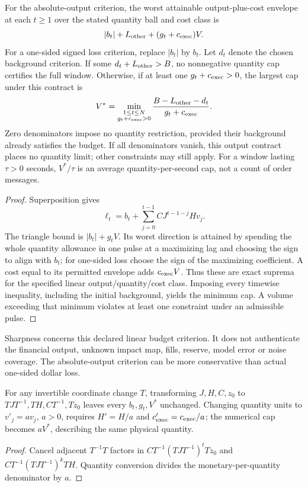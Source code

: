 \begin{proposition}
For the absolute-output criterion, the worst attainable output-plus-cost envelope at each $t\ge1$ over the stated quantity ball and cost class is
\[
|b_t|+L_{\rm other}+(g_t+c_{\rm exec})V.
\]
For a one-sided signed loss criterion, replace $|b_t|$ by $b_t$. Let $d_t$ denote the chosen background criterion. If some $d_t+L_{\rm other}>B$, no nonnegative quantity cap certifies the full window. Otherwise, if at least one $g_t+c_{\rm exec}>0$, the largest cap under this contract is
\[
V^*=\min_{\substack{1\le t\le N\\g_t+c_{\rm exec}>0}}
\frac{B-L_{\rm other}-d_t}{g_t+c_{\rm exec}}.
\]
Zero denominators impose no quantity restriction, provided their background already satisfies the budget. If all denominators vanish, this output contract places no quantity limit; other constraints may still apply. For a window lasting $\tau>0$ seconds, $V^*/\tau$ is an average quantity-per-second cap, not a count of order messages.
\end{proposition}
\begin{proof}
Superposition gives
\[
\ell_t=b_t+\sum_{j=0}^{t-1}CJ^{t-1-j}Hv_j.
\]
The triangle bound is $|b_t|+g_tV$. Its worst direction is attained by spending the whole quantity allowance in one pulse at a maximizing lag and choosing the sign to align with $b_t$; for one-sided loss choose the sign of the maximizing coefficient. A cost equal to its permitted envelope adds $c_{\rm exec}V$. Thus these are exact suprema for the specified linear output/quantity/cost class. Imposing every timewise inequality, including the initial background, yields the minimum cap. A volume exceeding that minimum violates at least one constraint under an admissible pulse.
\end{proof}

Sharpness concerns this declared linear budget criterion. It does not authenticate the financial output, unknown impact map, fills, reserve, model error or noise coverage. The absolute-output criterion can be more conservative than actual one-sided dollar loss.

\begin{proposition}
For any invertible coordinate change $T$, transforming $J,H,C,z_0$ to $TJT^{-1},TH,CT^{-1},Tz_0$ leaves every $b_t,g_t,V^*$ unchanged. Changing quantity units to $v'_j=av_j$, $a>0$, requires $H'=H/a$ and $c'_{\rm exec}=c_{\rm exec}/a$; the numerical cap becomes $aV^*$, describing the same physical quantity.
\end{proposition}
\begin{proof}
Cancel adjacent $T^{-1}T$ factors in $CT^{-1}(TJT^{-1})^tTz_0$ and $CT^{-1}(TJT^{-1})^kTH$. Quantity conversion divides the monetary-per-quantity denominator by $a$.
\end{proof}


